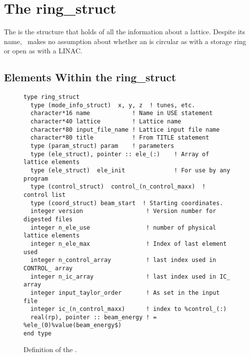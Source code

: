 \chapter{The ring\_struct}
\label{c:ring_struct}

The  is the structure that holds of all the information 
about a lattice.   Despite its name, \bmad\
makes no assumption about whether an  is circular as
with a storage ring or open as with a LINAC.

\section{Elements Within the ring\_struct}
\label {s:ring_struct}

\begin{figure}[htb]
\centering
\begin{verbatim}
type ring_struct
  type (mode_info_struct)  x, y, z  ! tunes, etc.
  character*16 name            ! Name in USE statement
  character*40 lattice         ! Lattice name
  character*80 input_file_name ! Lattice input file name
  character*80 title           ! From TITLE statement
  type (param_struct) param    ! parameters
  type (ele_struct), pointer :: ele_(:)    ! Array of lattice elements
  type (ele_struct)  ele_init              ! For use by any program
  type (control_struct)  control_(n_control_maxx)  ! control list
  type (coord_struct) beam_start  ! Starting coordinates.
  integer version                  ! Version number for digested files
  integer n_ele_use                ! number of physical lattice elements
  integer n_ele_max                ! Index of last element used
  integer n_control_array          ! last index used in CONTROL_ array
  integer n_ic_array               ! last index used in IC_ array
  integer input_taylor_order       ! As set in the input file
  integer ic_(n_control_maxx)      ! index to %control_(:)
  real(rp), pointer :: beam_energy ! = %ele_(0)%value(beam_energy$)
end type
\end{verbatim}
\caption{Definition of the .}
\label{f:ring_struct}
\end{figure}

